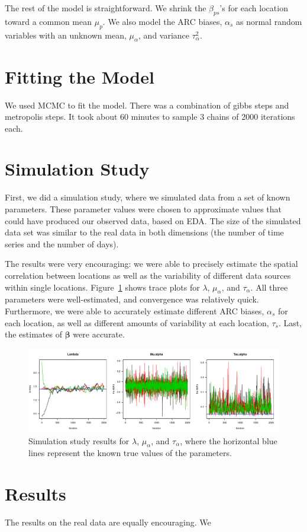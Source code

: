 \documentclass[12pt]{article}
\def\bbeta{\pmb{\beta}}
\begin{document}
The rest of the model is straightforward. We shrink the $\beta_{ps}$'s for each location toward a common mean $\mu_p$. We also model the ARC biases, $\alpha_s$ as normal random variables with an unknown mean, $\mu_\alpha$, and variance $\tau_\alpha^2$.

\section{Fitting the Model}
We used MCMC to fit the model. There was a combination of gibbs steps and metropolis steps. It took about 60 minutes to sample 3 chains of 2000 iterations each.

\section{Simulation Study}
First, we did a simulation study, where we simulated data from a set of known parameters. These parameter values were chosen to approximate values that could have produced our observed data, based on EDA. The size of the simulated data set was similar to the real data in both dimensions (the number of time series and the number of days).

The results were very encouraging: we were able to precisely estimate the spatial correlation between locations as well as the variability of different data sources within single locations. Figure~\ref{fig_sim_sum1} shows trace plots for $\lambda$, $\mu_\alpha$, and $\tau_\alpha$. All three parameters were well-estimated, and convergence was relatively quick. Furthermore, we were able to accurately estimate different ARC biases, $\alpha_s$ for each location, as well as different amounts of variability at each location, $\tau_s$. Last, the estimates of $\bbeta$ were accurate.
\begin{figure}[htbp]
\begin{center}
\includegraphics[width=6.0in]{fig_sim_sum1.pdf}
\caption{Simulation study results for $\lambda$, $\mu_\alpha$, and $\tau_\alpha$, where the horizontal blue lines represent the known true values of the parameters.}
\label{fig_sim_sum1}
\end{center}
\end{figure}




\section{Results}
The results on the real data are equally encouraging. We 
\end{document}
